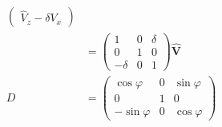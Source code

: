 \documentclass{article}
\renewcommand{\vec}[1]{\boldsymbol{\mathbf{#1}}}
\newcommand{\uvec}[1]{\hat{\vec{#1}}}
\begin{document}
\begin{align*}
\begin{pmatrix}
                                   \hat{V}_z - \delta V_x
                                 \end{pmatrix}                                                                                     \\
                             & = \begin{pmatrix}
                                   1       & 0 & \delta \\
                                   0       & 1 & 0      \\
                                   -\delta & 0 & 1
                                 \end{pmatrix} \uvec{V}                                                                                           \\
  D                          & = \begin{pmatrix}
                                   \cos \varphi  & 0 & \sin \varphi \\
                                   0             & 1 & 0            \\
                                   -\sin \varphi & 0 & \cos \varphi
                                 \end{pmatrix}
\end{align*}

\setcounter{subsection}{17}
\subsection{}
\end{document}
